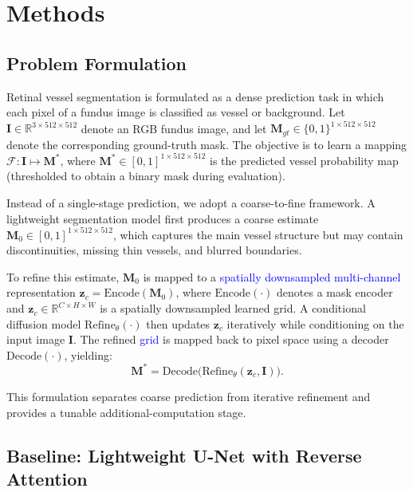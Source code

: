 \documentclass[jimaging,article,submit,pdftex,moreauthors]
  {Definitions/mdpi}
\DeclareRobustCommand{\rev}[1]{\textcolor{blue}{#1}}
\DeclareRobustCommand{\rev}[1]{#1}
\begin{document}
\section{Methods}
\label{sec:methods}

\subsection{Problem Formulation}
\label{sec:problem}

Retinal vessel segmentation is formulated as a dense prediction task in which each pixel of a fundus image is classified as vessel or background. Let $\mathbf{I}\in\mathbb{R}^{3\times512\times512}$ denote an RGB fundus image, and let $\mathbf{M}_{gt}\in\{0,1\}^{1\times512\times512}$ denote the corresponding ground-truth mask. The objective is to learn a mapping $\mathcal{F}:\mathbf{I}\mapsto \mathbf{M}^*$, where $\mathbf{M}^*\in[0,1]^{1\times512\times512}$ is the predicted vessel probability map (thresholded to obtain a binary mask during evaluation).

Instead of a single-stage prediction, we adopt a coarse-to-fine framework. A lightweight segmentation model first produces a coarse estimate $\mathbf{M}_0\in[0,1]^{1\times512\times512}$, which captures the main vessel structure but may contain discontinuities, missing thin vessels, and blurred boundaries.

To refine this estimate, $\mathbf{M}_0$ is mapped to a \rev{spatially downsampled multi-channel} representation $\mathbf{z}_c=\mathrm{Encode}(\mathbf{M}_0)$, where $\mathrm{Encode}(\cdot)$ denotes a mask encoder and $\mathbf{z}_c\in\mathbb{R}^{C\times H\times W}$ is a spatially downsampled learned grid. A conditional diffusion model $\mathrm{Refine}_{\theta}(\cdot)$ then updates $\mathbf{z}_c$ iteratively while conditioning on the input image $\mathbf{I}$. The refined \rev{grid} is mapped back to pixel space using a decoder $\mathrm{Decode}(\cdot)$, yielding:
\begin{equation}
\mathbf{M}^* = \mathrm{Decode}\big(\mathrm{Refine}_{\theta}(\mathbf{z}_c, \mathbf{I})\big).
\end{equation}

This formulation separates coarse prediction from iterative refinement and provides a tunable additional-computation stage.

\subsection{Baseline: Lightweight U-Net with Reverse Attention}
\end{document}
